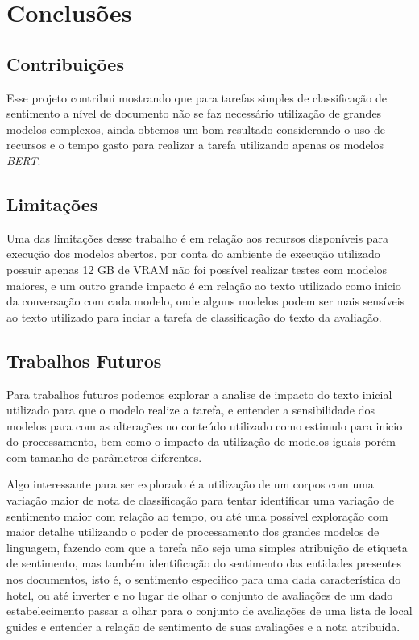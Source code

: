 \chapter{Conclusões}
\label{cap:conclusao}

\section{Contribuições}
\label{cap:conclusao:sec:contribuicoes}

Esse projeto contribui mostrando que para tarefas simples de classificação de sentimento a nível de documento não se faz necessário utilização de grandes modelos complexos, ainda obtemos um bom resultado considerando o uso de recursos e o tempo gasto para realizar a tarefa utilizando apenas os modelos \textit{BERT}.

\section{Limitações}
\label{cap:conclusao:sec:limitacoes}

Uma das limitações desse trabalho é em relação aos recursos disponíveis para execução dos modelos abertos, por conta do ambiente de execução utilizado possuir apenas 12 GB de VRAM não foi possível realizar testes com modelos maiores, e um outro grande impacto é em relação ao texto utilizado como inicio da conversação com cada modelo, onde alguns modelos podem ser mais sensíveis ao texto utilizado para inciar a tarefa de classificação do texto da avaliação.


\section{Trabalhos Futuros}
\label{cap:conclusao:sec:trab_futuros}

Para trabalhos futuros podemos explorar a analise de impacto do texto inicial utilizado para que o modelo realize a tarefa, e entender a sensibilidade dos modelos para com as alterações no conteúdo utilizado como estimulo para inicio do processamento, bem como o impacto da utilização de modelos iguais porém com tamanho de parâmetros diferentes.

Algo interessante para ser explorado é a utilização de um corpos com uma variação maior de nota de classificação para tentar identificar uma variação de sentimento maior com relação ao tempo, ou até uma possível exploração com maior detalhe utilizando o poder de processamento dos grandes modelos de linguagem, fazendo com que a tarefa não seja uma simples atribuição de etiqueta de sentimento, mas também identificação do sentimento das entidades presentes nos documentos, isto é, o sentimento especifico para uma dada característica do hotel, ou até inverter e no lugar de olhar o conjunto de avaliações de um dado estabelecimento passar a olhar para o conjunto de avaliações de uma lista de local guides e entender a relação de sentimento de suas avaliações e a nota atribuída.
